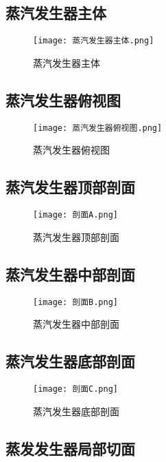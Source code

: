 \subsection{蒸汽发生器主体}

\begin{figure}[H]
    \centering
    \texttt{[image: 蒸汽发生器主体.png]}
    \caption{蒸汽发生器主体}
    \label{蒸汽发生器主体}
\end{figure}

\subsection{蒸汽发生器俯视图}

\begin{figure}[H]
    \centering
    \texttt{[image: 蒸汽发生器俯视图.png]}
    \caption{蒸汽发生器俯视图}
    \label{蒸汽发生器俯视图}
\end{figure}

\subsection{蒸汽发生器顶部剖面}

\begin{figure}[H]
    \centering
    \texttt{[image: 剖面A.png]}
    \caption{蒸汽发生器顶部剖面}
    \label{蒸汽发生器顶部剖面}
\end{figure}

\subsection{蒸汽发生器中部剖面}

\begin{figure}[H]
    \centering
    \texttt{[image: 剖面B.png]}
    \caption{蒸汽发生器中部剖面}
    \label{蒸汽发生器中部剖面}
\end{figure}

\subsection{蒸汽发生器底部剖面}

\begin{figure}[H]
    \centering
    \texttt{[image: 剖面C.png]}
    \caption{蒸汽发生器底部剖面}
    \label{蒸汽发生器底部剖面}
\end{figure}

\subsection{蒸发发生器局部切面}

